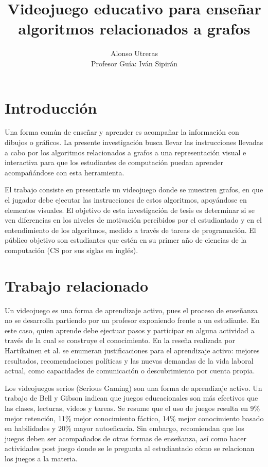 \documentclass[submission]{eptcs}
\title{Videojuego educativo para enseñar algoritmos relacionados a grafos}
\author{ Alonso Utreras\\
Profesor Guía: Iván Sipirán
\institute{Departmento de Ciencias de la Computación\\
Universidad de Chile\\
Santiago, Chile}
\email{alonso.utreras@ug.uchile.cl}
\email{autreras@dcc.uchile.cl}
}
\begin{document}
\maketitle

\section{Introducción}
 
Una forma común de enseñar y aprender es acompañar la información con dibujos o gráficos. La presente investigación
busca llevar las instrucciones llevadas a cabo por los algoritmos relacionados a grafos a una
representación visual e interactiva para que los estudiantes de computación puedan aprender acompañándose
con esta herramienta. 

El trabajo consiste en presentarle un videojuego donde se muestren grafos, en que el jugador
debe ejecutar las instrucciones de estos algoritmos, apoyándose en elementos visuales. El objetivo de esta investigación de tesis es 
determinar si se ven diferencias en los niveles de motivación percibidos por el estudiantado y en el entendimiento
de los algoritmos, medido a través de tareas de programación. El público objetivo son estudiantes
que estén en su primer año de ciencias de la computación (CS por sus siglas en inglés).

\section{Trabajo relacionado} 


Un videojuego es una forma de aprendizaje activo, pues el proceso de enseñanza no se desarrolla partiendo por un profesor
exponiendo frente a un estudiante. En este caso, quien aprende debe ejectuar pasos y
participar en alguna actividad a través de la cual se construye el conocimiento. En la reseña realizada por Hartikainen et al. \cite{active_learning_review}
se enumeran justificaciones para el aprendizaje activo:  mejores resultados, recomendaciones políticas y las nuevas demandas de la vida laboral actual,
como capacidades de comunicación o descubrimiento por cuenta propia. 

Los videojuegos serios (Serious Gaming) son una forma de aprendizaje activo. Un trabajo de Bell y Gibson \cite{evaluation_of_games_for_teaching_cs} indican que juegos
educacionales son más efectivos que las clases, lecturas, videos y tareas. Se resume que el uso de juegos resulta en 9\% mejor retención, 11\% mejor conocimiento fáctico,
14\% mejor conocimiento basado en habilidades y 20\% mayor autoeficacia. Sin embargo, recomiendan que los juegos deben ser acompañados
de otras formas de enseñanza, así como hacer actividades post juego donde se le pregunta al estudiantado cómo se relacionan los juegos a la materia.
\end{document}
